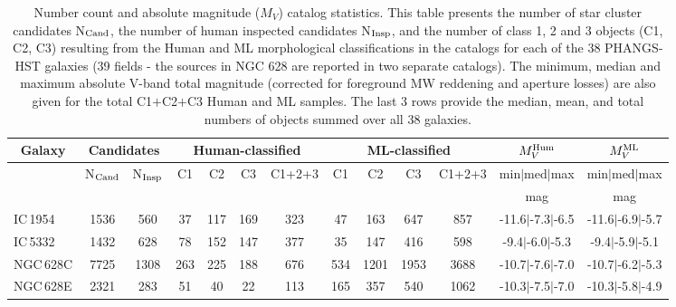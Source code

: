 %
\begin{table*}
\begin{center}
\caption{Number count and absolute magnitude ($M_V$) catalog statistics. This table presents the number of star cluster candidates N$_{\rm Cand}$, the number of human inspected candidates N$_{\rm Insp}$, and the number of class 1, 2 and 3 objects (C1, C2, C3) resulting from the Human and ML morphological classifications in the catalogs for each of the 38 PHANGS-HST galaxies (39 fields - the sources in NGC 628 are reported in two separate catalogs). The minimum, median and maximum absolute V-band total magnitude (corrected for foreground MW reddening and aperture losses) are also given for the total C1$+$C2$+$C3 Human and ML samples. The last 3 rows provide the median, mean, and total numbers of objects summed over all 38 galaxies.}
\label{tab:numbers}
\begin{tabular}{lcccccccccccc}
\hline\hline
\multicolumn{1}{c}{Galaxy} & \multicolumn{2}{c}{Candidates} & \multicolumn{4}{c}{Human-classified} & \multicolumn{4}{c}{ML-classified} & \multicolumn{1}{c}{$M_V^{\rm Hum}$} & \multicolumn{1}{c}{$M_V^{\rm ML}$} \\ 
\hline
\multicolumn{1}{c}{} & \multicolumn{1}{c}{N$_{\rm Cand}$} & \multicolumn{1}{c}{N$_{\rm Insp}$} & \multicolumn{1}{c}{C1} & \multicolumn{1}{c}{C2} & \multicolumn{1}{c}{C3} & \multicolumn{1}{c}{C1+2+3} & \multicolumn{1}{c}{C1} & \multicolumn{1}{c}{C2} & \multicolumn{1}{c}{C3} & \multicolumn{1}{c}{C1+2+3} & \multicolumn{1}{c}{min$\vert$med$\vert$max} & \multicolumn{1}{c}{min$\vert$med$\vert$max} \\ 
\hline
\multicolumn{1}{c}{} & \multicolumn{1}{c}{} & \multicolumn{1}{c}{} & \multicolumn{4}{c}{} & \multicolumn{4}{c}{} & \multicolumn{1}{c}{mag} & \multicolumn{1}{c}{mag} \\ 
\hline
IC\,1954 & 1536 & 560 & 37 & 117 & 169 & 323 & 47 & 163 & 647 & 857 & -11.6$\vert$-7.3$\vert$-6.5 & -11.6$\vert$-6.9$\vert$-5.7 \\ 
IC\,5332 & 1432 & 628 & 78 & 152 & 147 & 377 & 35 & 147 & 416 & 598 & -9.4$\vert$-6.0$\vert$-5.3 & -9.4$\vert$-5.9$\vert$-5.1 \\ 
NGC\,628C & 7725 & 1308 & 263 & 225 & 188 & 676 & 534 & 1201 & 1953 & 3688 & -10.7$\vert$-7.6$\vert$-7.0 & -10.7$\vert$-6.2$\vert$-5.3 \\ 
NGC\,628E & 2321 & 283 & 51 & 40 & 22 & 113 & 165 & 357 & 540 & 1062 & -10.3$\vert$-7.5$\vert$-7.0 & -10.3$\vert$-5.8$\vert$-4.9 \\ 

\end{tabular}
\end{center}
\end{table*}
